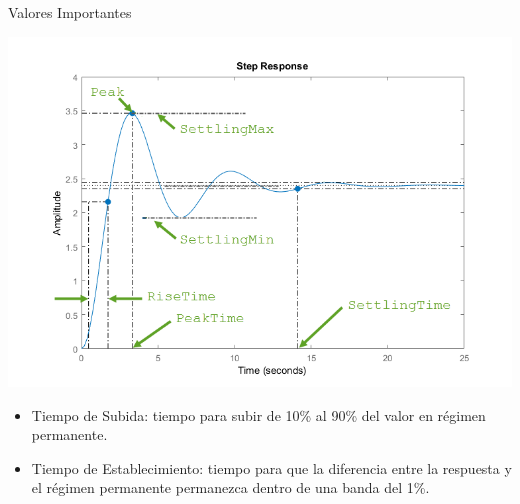 \documentclass[aspectratio=169, usenames,svgnames,dvipsnames]{beamer}
\begin{document}
\begin{frame}[label={sec:orga4b6666}]{Valores Importantes}
\begin{center}
\includegraphics[height=0.6\textheight]{figs/RespuestaEscalon_SegundoOrden.png}
\end{center}

\begin{itemize}
\item \alert{Tiempo de Subida}: tiempo para subir de 10\% al 90\% del valor en régimen permanente.

\item \alert{Tiempo de Establecimiento}: tiempo para que la diferencia entre la respuesta y el régimen permanente permanezca dentro de una banda del 1\%.
\end{itemize}
\end{frame}
\end{document}
